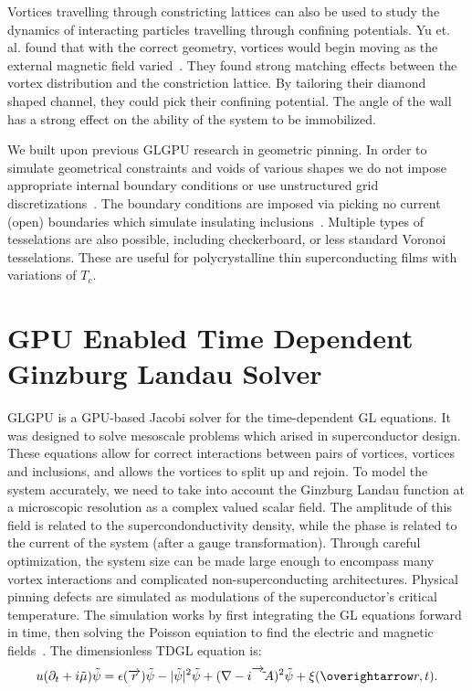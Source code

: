 Vortices travelling through constricting lattices can also be used to study the dynamics of interacting particles travelling through confining potentials. Yu et. al. found that with the correct geometry, vortices would begin moving as the external magnetic field varied~\cite{Yu10}. They found strong matching effects between the vortex distribution and the constriction lattice. By tailoring their diamond shaped channel, they could pick their confining potential. The angle of the wall has a strong effect on the ability of the system to be immobilized.

We built upon previous GLGPU research in geometric pinning. In order to simulate geometrical constraints and voids of various shapes we do not impose appropriate internal boundary conditions or use unstructured grid discretizations~\cite{Kwok16}. The boundary conditions are imposed via picking no current (open) boundaries which simulate insulating inclusions~\cite{Sadovskyy14}. Multiple types of tesselations are also possible, including checkerboard, or less standard Voronoi tesselations. These are useful for polycrystalline thin superconducting films with variations of $T_c$.

\section{GPU Enabled Time Dependent Ginzburg Landau Solver}
GLGPU is a GPU-based Jacobi solver for the time-dependent GL equations. It was designed to solve mesoscale problems which arised in superconductor design. These equations allow for correct interactions between pairs of vortices, vortices and inclusions, and allows the vortices to split up and rejoin. To model the system accurately, we need to take into account the Ginzburg Landau function at a microscopic resolution as a complex valued scalar field. The amplitude of this field is related to the supercondonductivity density, while the phase is related to the current of the system (after a gauge transformation). Through careful optimization, the system size can be made large enough to encompass many vortex interactions and complicated non-superconducting architectures. Physical pinning defects are simulated as modulations of the superconductor's critical temperature. The simulation works by first integrating the GL equations forward in time, then solving the Poisson equiation to find the electric and magnetic fields~\cite{Sadovskyy14}. The dimensionless TDGL equation is:
\begin{eqnarray}
u (\partial_t + i \tilde \mu ) \tilde \psi = \epsilon (\overrightarrow r) \tilde \psi - |\tilde \psi|^2 \tilde \psi + (\nabla - i \overrightarrow \tilde A)^2 \tilde \psi + \xi (\overightarrow r , t). 
\label{unitless}
\end{eqnarray}

